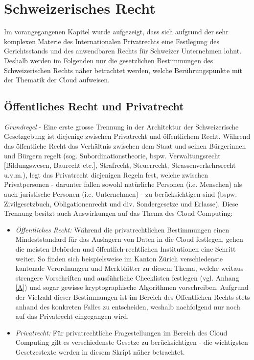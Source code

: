 \documentclass[a4paper,pointlessnumbers]{scrreprt}
\begin{document}
\chapter{Schweizerisches Recht}
Im vorangegangenen Kapitel wurde aufgezeigt, dass sich aufgrund der sehr komplexen Materie des Internationalen Privatrechts eine Festlegung des Gerichtsstands und des anwendbaren Rechts für Schweizer Unternehmen lohnt. Deshalb werden im Folgenden nur die gesetzlichen Bestimmungen des Schweizerischen Rechts näher betrachtet werden, welche Berührungspunkte mit der Thematik der Cloud aufweisen.

\section{Öffentliches Recht und Privatrecht}
\textit{Grundregel} - Eine erste grosse Trennung in der \glqq Architektur\grqq{} der Schweizerische Gesetzgebung ist diejenige zwischen Privatrecht und öffentlichem Recht. Während das öffentliche Recht das Verhältnis zwischen dem Staat und seinen Bürgerinnen und Bürgern regelt (sog. Subordinationstheorie, bspw. Verwaltungsrecht [Bildungswesen, Baurecht etc.], Strafrecht, Steuerrecht, Strassenverkehrsrecht u.v.m.), legt das Privatrecht diejenigen Regeln fest, welche zwischen Privatpersonen - darunter fallen sowohl natürliche Personen (i.e. Menschen) als auch juristische Personen (i.e. Unternehmen) - zu berücksichtigen sind (bspw. Zivilgesetzbuch, Obligationenrecht und div. Sondergesetze und Erlasse). Diese Trennung besitzt auch Auswirkungen auf das Thema des Cloud Computing:
\begin{itemize}[itemsep=0pt]
\item \textit{Öffentliches Recht:} Während die privatrechtlichen Bestimmungen einen Mindeststandard für das Auslagern von Daten in die Cloud festlegen, gehen die meisten Behörden und öffentlich-rechtlichen Institutionen eine Schritt weiter. So finden sich beispielsweise im Kanton Zürich verschiedenste kantonale Verordnungen und Merkblätter zu diesem Thema, welche weitaus strengere Vorschriften und ausführliche Checklisten festlegen (vgl. Anhang \ref{A}) und sogar gewisse kryptographische Algorithmen vorschreiben. Aufgrund der Vielzahl dieser Bestimmungen ist im Bereich des Öffentlichen Rechts stets anhand des konkreten Falles zu entscheiden, weshalb nachfolgend nur noch auf das Privatrecht eingegangen wird.
\item \textit{Privatrecht:} Für privatrechtliche Fragestellungen im Bereich des Cloud Computing gilt es verschiedenste Gesetze zu berücksichtigen - die wichtigsten Gesetzestexte werden in diesem Skript näher betrachtet.
\end{itemize}
\end{document}
